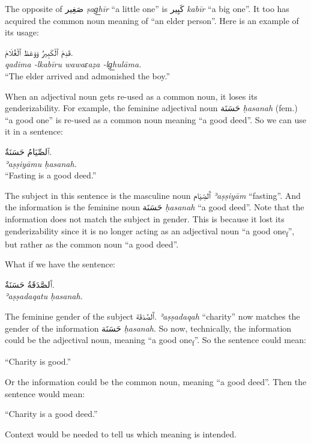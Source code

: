 \documentclass[
  10pt,
]{book}
\begin{document}
The opposite of
\foreignlanguage{arabic}{صَغِير} \emph{ṣag͟hīr} \enquote{a little one}
is \foreignlanguage{arabic}{کَبِير} \emph{kabīr} \enquote{a big one}. It too has acquired the common noun meaning of \enquote{an elder person}. Here is an example of its usage:

\foreignlanguage{arabic}{قَدِمَ ٱلْکَبِيرُ وَوَعَظَ ٱلْغُلَامَ.}\\
\emph{qadima -lkabīru wawaɛaẓa -lg͟hulāma.}\\
\enquote{The elder arrived and admonished the boy.}

When an adjectival noun gets re-used as a common noun, it loses its genderizability.
For example, the feminine adjectival noun \foreignlanguage{arabic}{حَسَنَة} \emph{ḥasanah} (fem.) \enquote{a good one} is re-used as a common noun meaning \enquote{a good deed}. So we can use it in a sentence:

\foreignlanguage{arabic}{ٱلصِّيَامُ حَسَنَةٌ.}\\
\emph{ʾaṣṣiyāmu ḥasanah.}\\
\enquote{Fasting is a good deed.}

The subject in this sentence is the masculine noun \foreignlanguage{arabic}{ٱَلصِّيَام} \emph{ʾaṣṣiyām} \enquote{fasting}.
And the information is the feminine noun \foreignlanguage{arabic}{حَسَنَة} \emph{ḥasanah} \enquote{a good deed}.
Note that the information does not match the subject in gender. This is because it lost its genderizability since it is no longer acting as an adjectival noun \enquote{a good one\textsubscript{f}}, but rather as the common noun \enquote{a good deed}.

What if we have the sentence:

\foreignlanguage{arabic}{ٱَلصَّدَقَةُ حَسَنَةٌ.}\\
\emph{ʾaṣṣadaqatu ḥasanah.}

The feminine gender of the subject
\foreignlanguage{arabic}{ٱَلصَّدَقَة.}
\emph{ʾaṣṣadaqah} \enquote{charity} now matches the gender of the information
\foreignlanguage{arabic}{حَسَنَة} \emph{ḥasanah}.
So now, technically, the information could be the adjectival noun, meaning \enquote{a good one\textsubscript{f}}. So the sentence could mean:

\enquote{Charity is good.}

Or the information could be the common noun, meaning \enquote{a good deed}. Then the sentence would mean:

\enquote{Charity is a good deed.}

Context would be needed to tell us which meaning is intended.
\end{document}
